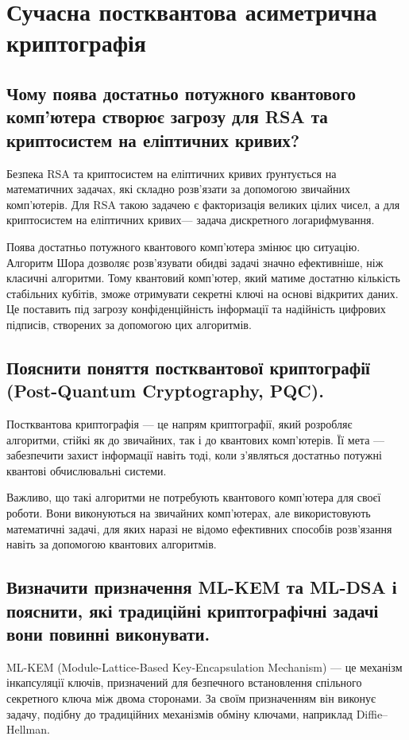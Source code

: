 \section{Сучасна постквантова асиметрична криптографія}

\subsection{Чому поява достатньо потужного квантового комп'ютера створює загрозу для RSA та криптосистем на еліптичних кривих?}

Безпека RSA та криптосистем на еліптичних кривих ґрунтується на математичних задачах, які складно розв'язати за допомогою 
звичайних комп'ютерів. Для RSA такою задачею є факторизація великих цілих чисел, а для криптосистем на еліптичних 
кривих— задача дискретного логарифмування.

Поява достатньо потужного квантового комп'ютера змінює цю ситуацію. Алгоритм Шора дозволяє розв'язувати обидві задачі значно ефективніше, 
ніж класичні алгоритми. Тому квантовий комп'ютер, який матиме достатню кількість стабільних кубітів, зможе отримувати секретні 
ключі на основі відкритих даних. Це поставить під загрозу конфіденційність інформації та надійність цифрових підписів, створених 
за допомогою цих алгоритмів.

\subsection{Пояснити поняття постквантової криптографії (Post-Quantum Cryptography, PQC).}

Постквантова криптографія — це напрям криптографії, який розробляє алгоритми, стійкі як до звичайних, так і до квантових комп'ютерів. 
Її мета — забезпечити захист інформації навіть тоді, коли з'являться достатньо потужні квантові обчислювальні системи.

Важливо, що такі алгоритми не потребують квантового комп'ютера для своєї роботи. Вони виконуються на звичайних комп'ютерах, 
але використовують математичні задачі, для яких наразі не відомо ефективних способів розв'язання навіть за допомогою квантових алгоритмів.

\subsection{Визначити призначення ML-KEM та ML-DSA і пояснити, які традиційні криптографічні задачі вони повинні виконувати.}

ML-KEM (Module-Lattice-Based Key-Encapsulation Mechanism) — це механізм інкапсуляції ключів, призначений для безпечного 
встановлення спільного секретного ключа між двома сторонами. За своїм призначенням він виконує задачу, подібну до традиційних 
механізмів обміну ключами, наприклад Diffie--Hellman.

